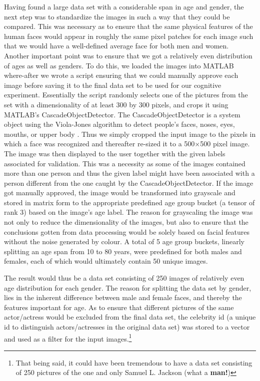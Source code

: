 Having found a large data set with a considerable span in age and gender, the next step was to standardize the images in such a way that they could be compared. This was necessary as to ensure that the same physical features of the human faces would appear in roughly the same pixel patches for each image such that we would have a well-defined average face for both men and women. Another important point was to ensure that we got a relatively even distribution of ages as well as genders. To do this, we loaded the images into MATLAB where-after we wrote a script ensuring that we could manually approve each image before saving it to the final data set to be used for our cognitive experiment. Essentially the script randomly selects one of the pictures from the set with a dimensionality of at least 300 by 300 pixels, and crops it using MATLAB's CascadeObjectDetector. The CascadeObjectDetector is a system object using the Viola-Jones algorithm to detect people’s faces, noses, eyes, mouths, or upper body \cite{viola-jones}. Thus we simply cropped the input image to the pixels in which a face was recognized and thereafter re-sized it to a 500$\times$500 pixel image. The image was then displayed to the user together with the given labels associated for validation. This was a necessity as some of the images contained more than one person and thus the given label might have been associated with a person different from the one caught by the CascadeObjectDetector. If the image got manually approved, the image would be transformed into grayscale and stored in matrix form to the appropriate predefined age group bucket (a tensor of rank 3) based on the image's age label. The reason for grayscaling the image was not only to reduce the dimensionality of the images, but also to ensure that the conclusions gotten from data processing would be solely based on facial features without the noise generated by colour. A total of 5 age group buckets, linearly splitting an age span from 10 to 80 years, were predefined for both males and females, each of which would ultimately contain 50 unique images. 

The result would thus be a data set consisting of 250 images of relatively even age distribution for each gender. The reason for splitting the data set by gender, lies in the inherent difference between male and female faces, and thereby the features important for age. As to ensure that different pictures of the same actor/actress would be excluded from the final data set, the celebrity id (a unique id to distinguish actors/actresses in the original data set) was stored to a vector and used as a filter for the input images.\footnote{That being said, it could have been tremendous to have a data set consisting of 250 pictures of the one and only Samuel L. Jackson (what a \textbf{man!})}

